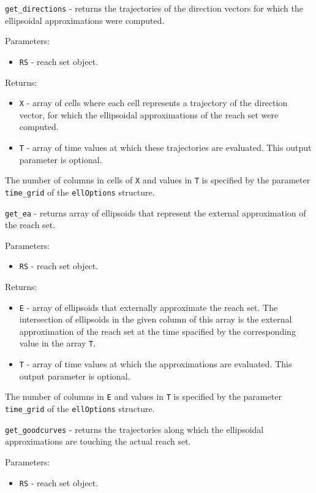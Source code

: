 \documentclass{report}
\begin{document}
\newpage

{\Large {\tt get\_directions}} - returns the trajectories of the direction
vectors for which the ellipsoidal approximations were computed.

Parameters:
\begin{itemize}
\item {\tt RS} - reach set object.
\end{itemize}

Returns:
\begin{itemize}
\item {\tt X} - array of cells where each cell represents a trajectory
of the direction vector, for which the ellipsoidal approximations of the
reach set were computed.
\item {\tt T} - array of time values at which these trajectories
are evaluated. This output parameter is optional.
\end{itemize}
The number of columns in cells of {\tt X} and values in {\tt T} is specified by
the parameter {\tt time\_grid} of the {\tt ellOptions} structure.

\newpage

{\Large {\tt get\_ea}} - returns array of ellipsoids that represent the
external approximation of the reach set.

Parameters:
\begin{itemize}
\item {\tt RS} - reach set object.
\end{itemize}

Returns:
\begin{itemize}
\item {\tt E} - array of ellipsoids that externally approximate the reach set.
The intersection of ellipsoids in the given column of this array is
the external approximation of the reach set at the time spacified by the
corresponding value in the array {\tt T}.
\item {\tt T} - array of time values at which the approximations
are evaluated. This output parameter is optional.
\end{itemize}
The number of columns in {\tt E} and values in {\tt T} is specified by
the parameter {\tt time\_grid} of the {\tt ellOptions} structure.

\newpage

{\Large {\tt get\_goodcurves}} - returns the trajectories along which
the ellipsoidal approximations are touching the actual reach set.

Parameters:
\begin{itemize}
\item {\tt RS} - reach set object.
\end{itemize}
\end{document}
